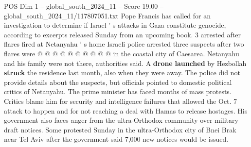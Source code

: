 \begin{textsample}{POS Dim 1 – global\_south\_2024\_11 – Score 19.00 – global\_south\_2024\_11/117807051.txt}
Pope Francis has called for an investigation to determine if Israel ' s attacks in Gaza constitute genocide, according to excerpts released Sunday from an upcoming book. 3 arrested after flares fired at Netanyahu ' s home Israeli police arrested three suspects after two flares were @ @ @ @ @ @ @ @ @ @ in the coastal city of Caesarea.
Netanyahu and his family were not there, authorities said.
A \textbf{drone} \textbf{launched} by Hezbollah \textbf{struck} the residence last month, also when they were away.
The police did not provide details about the suspects, but officials pointed to domestic political critics of Netanyahu.
The prime minister has faced months of mass protests.
Critics blame him for security and intelligence failures that allowed the Oct. 7 attack to happen and for not reaching a deal with Hamas to release hostages.
His government also faces anger from the ultra-Orthodox community over military draft notices.
Some protested Sunday in the ultra-Orthodox city of Bnei Brak near Tel Aviv after the government said 7,000 new notices would be issued.

\end{textsample}

